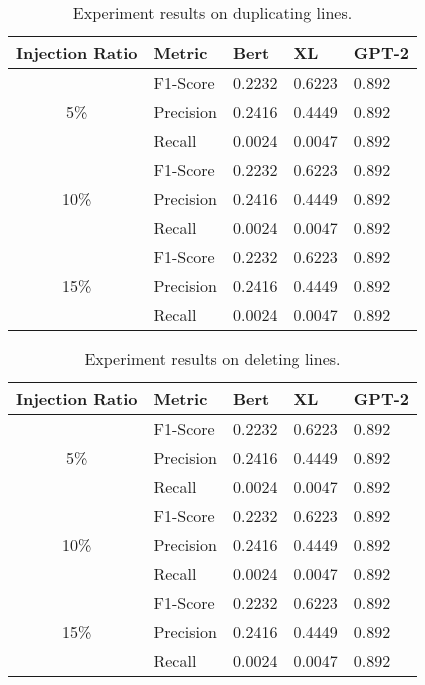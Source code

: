 \begin{appendix}
\begin{table}
\centering
\begin{tabular}{ c l l l l }
\toprule
Injection Ratio & Metric & Bert & XL & GPT-2\\
\midrule
     & F1-Score & 0.2232 & 0.6223 & 0.892\\
5\%  & Precision & 0.2416 & 0.4449 & 0.892\\
     & Recall & 0.0024 & 0.0047 & 0.892\\ 
\midrule
     & F1-Score & 0.2232 & 0.6223 & 0.892\\
10\% & Precision & 0.2416 & 0.4449 & 0.892\\
     & Recall & 0.0024 & 0.0047 & 0.892\\ 
\midrule
     & F1-Score & 0.2232 & 0.6223 & 0.892\\
15\% & Precision & 0.2416 & 0.4449 & 0.892\\
     & Recall & 0.0024 & 0.0047 & 0.892\\ 
\bottomrule
\end{tabular}
\caption{Experiment results on duplicating lines.}
\end{table}


\begin{table}
\centering
\begin{tabular}{ c l l l l }
\toprule
Injection Ratio & Metric & Bert & XL & GPT-2\\
\midrule
     & F1-Score & 0.2232 & 0.6223 & 0.892\\
5\%  & Precision & 0.2416 & 0.4449 & 0.892\\
     & Recall & 0.0024 & 0.0047 & 0.892\\ 
\midrule
     & F1-Score & 0.2232 & 0.6223 & 0.892\\
10\% & Precision & 0.2416 & 0.4449 & 0.892\\
     & Recall & 0.0024 & 0.0047 & 0.892\\ 
\midrule
     & F1-Score & 0.2232 & 0.6223 & 0.892\\
15\% & Precision & 0.2416 & 0.4449 & 0.892\\
     & Recall & 0.0024 & 0.0047 & 0.892\\ 
\bottomrule
\end{tabular}
\caption{Experiment results on deleting lines.}
\end{table}




\end{appendix}
